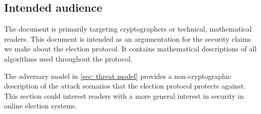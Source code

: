 \subsection{Intended audience}
The document is primarily targeting cryptographers or technical, mathematical readers. This document is intended as an argumentation for the security claims we make about the election protocol. It contains mathematical descriptions of all algorithms used throughout the protocol.

The adversary model in \cref{sec: threat model} provides a non-cryptographic description of the attack scenarios that the election protocol protects against. This section could interest readers with a more general interest in security in online election systems.
